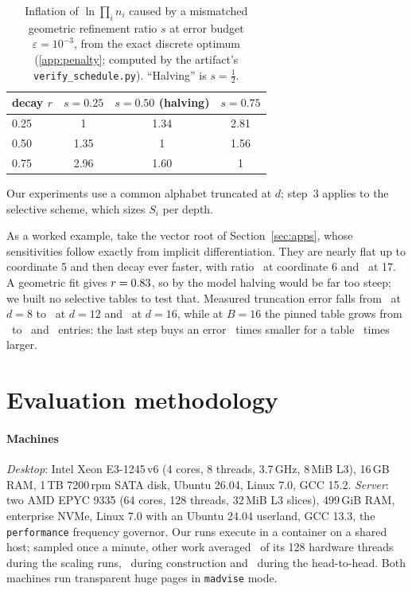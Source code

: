 \documentclass[preprint,12pt]{elsarticle}
\newcommand{\eps}{\varepsilon}
\begin{document}
\begin{table}[htbp]
\caption{Inflation of $\ln\prod_i n_i$ caused by a mismatched geometric refinement
ratio $s$ at error budget $\eps=10^{-3}$, from the exact discrete optimum
(\ref{app:penalty}; computed by the artifact's \texttt{verify\_schedule.py}). ``Halving'' is $s=\tfrac12$.}
\label{tab:penalty-short}
\centering\small
\begin{tabular}{lccc}
\toprule
decay $r$ & $s=0.25$ & $s=0.50$ (halving) & $s=0.75$ \\
\midrule
0.25 & 1 & 1.34 & 2.81 \\
0.50 & 1.35 & 1 & 1.56 \\
0.75 & 2.96 & 1.60 & 1 \\
\bottomrule
\end{tabular}
\end{table}

Our experiments use a common alphabet truncated at $d$; step~3 applies to the selective scheme, which sizes $S_i$ per depth.

As a worked example, take the vector root of Section~\ref{sec:apps}, whose sensitivities follow exactly from implicit differentiation. They are nearly flat up to coordinate 5 and then decay ever faster, with ratio \hTaperRatSix\ at coordinate 6 and \hTaperRatSeventeen\ at 17. A geometric fit gives $r=0.83$, so by the model halving would be far too steep; we built no selective tables to test that.
Measured truncation error falls from \hTruncEi\ at $d=8$ to \hTruncTw\ at $d=12$ and
\hTruncSx\ at $d=16$, while at $B=16$ the pinned table grows from \hNEi\ to \hNTw\ and \hNSx\
entries: the last step buys an error \hTaperShrink\ times smaller for a table \hTaperGrow\ times larger.

\section{Evaluation methodology}\label{sec:method}

\paragraph{Machines} \emph{Desktop}: Intel Xeon E3-1245\,v6 (4 cores, 8 threads, 3.7\,GHz, 8\,MiB L3),
16\,GB RAM, 1\,TB 7200\,rpm SATA disk, Ubuntu 26.04, Linux 7.0, GCC 15.2. \emph{Server}: two AMD EPYC 9335 (64 cores, 128 threads, 32\,MiB L3
slices), 499\,GiB RAM, enterprise NVMe, Linux 7.0 with an Ubuntu 24.04 userland,
GCC 13.3, the \texttt{performance} frequency governor. Our runs execute in a container on a shared host; sampled once a minute, other work averaged \hOtherSweep\ of its 128 hardware threads during the scaling runs,
\hOtherPar\ during construction and \hOtherHead\ during the head-to-head. Both machines run transparent huge
pages in \texttt{madvise} mode.
\end{document}

